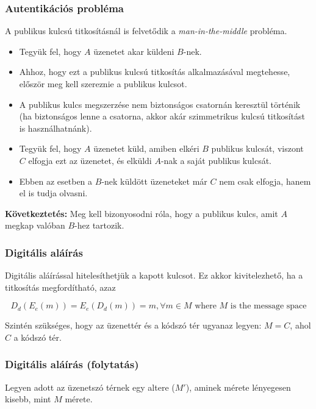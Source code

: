 \documentclass{beamer}
\begin{document}
\begin{frame}
    \frametitle{Autentikációs probléma}

    A publikus kulcsú titkosításnál is felvetődik a \textit{man-in-the-middle} probléma.

    \begin{itemize}
        \item Tegyük fel, hogy $A$ üzenetet akar küldeni $B$-nek.
        \item Ahhoz, hogy ezt a publikus kulcsú titkosítás alkalmazásával megtehesse, először meg kell szereznie a
              publikus kulcsot.
        \item A publikus kulcs megszerzése nem biztonságos csatornán keresztül történik (ha biztonságos lenne a csatorna,
              akkor akár szimmetrikus kulcsú titkosítást is használhatnánk).
        \item Tegyük fel, hogy $A$ üzenetet küld, amiben elkéri $B$ publikus kulcsát, viszont $C$ elfogja ezt az üzenetet,
              és elküldi $A$-nak a saját publikus kulcsát.
        \item Ebben az esetben a $B$-nek küldött üzeneteket már $C$ nem csak elfogja, hanem el is tudja olvasni.
    \end{itemize}

    \textbf{Következtetés:} Meg kell bizonyosodni róla, hogy a publikus kulcs, amit $A$ megkap valóban $B$-hez tartozik.
\end{frame}

\begin{frame}
    \frametitle{Digitális aláírás}

    Digitális aláírással hitelesíthetjük a kapott kulcsot. Ez akkor kivitelezhető, ha a titkosítás megfordítható, azaz

    \[D_d(E_e(m)) = E_e(D_d(m)) = m, \forall m \in M \text{ where $M$ is the message space}\]

    Szintén szükséges, hogy az üzenettér és a kódszó tér ugyanaz legyen: $M = C$, ahol $C$ a kódszó tér.
\end{frame}

\begin{frame}
    \frametitle{Digitális aláírás (folytatás)}

    Legyen adott az üzenetszó térnek egy altere ($M'$), aminek mérete lényegesen kisebb, mint $M$ mérete.
\end{frame}
\end{document}
